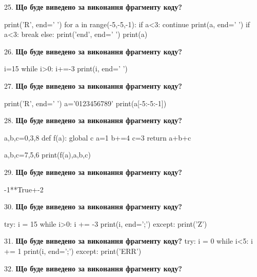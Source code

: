 \documentclass[11pt]{article}
\begin{document}
25. \textbf{Що буде виведено за виконання фрагменту коду?}

print('R', end=' ')
for a in range(-5,-5,-1):
    if a<3:
        continue
        print(a, end=' ')
    if a<3:
        break
    else:
        print('end', end=' ')
    print(a)
\par\vspace{5mm}

26. \textbf{Що буде виведено за виконання фрагменту коду?}

i=15
while i>0:
    i+=-3
print(i, end=' ')

\par\vspace{5mm}

27. \textbf{Що буде виведено за виконання фрагменту коду?}

print('R', end=' ')
a='0123456789'
print(a[-5:-5:-1])

\par\vspace{5mm}

28. \textbf{Що буде виведено за виконання фрагменту коду?}

a,b,c=0,3,8
def f(a):
global c    a=1
    b+=4
    c=3
    return a+b+c

a,b,c=7,5,6
print(f(a),a,b,c)
\par\vspace{5mm}

29. \textbf{Що буде виведено за виконання фрагменту коду?}

-1**True+-2
\par\vspace{5mm}

30. \textbf{Що буде виведено за виконання фрагменту коду?}

try:
    i = 15
    while i>0:
        i += -3
    print(i, end=';')
except:
    print('Z')

\par\vspace{5mm}

31. \textbf{Що буде виведено за виконання фрагменту коду?}
try:
    i = 0
    while i<5:
        i += 1
    print(i, end=';')
except:
    print('ERR')
\par\vspace{5mm}

32. \textbf{Що буде виведено за виконання фрагменту коду?}
\end{document}
